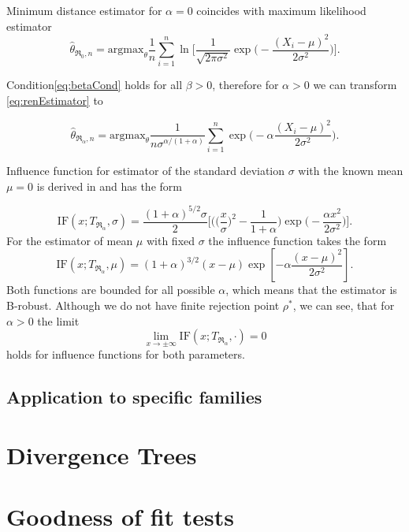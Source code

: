 Minimum \ren distance estimator for $\alpha = 0$ coincides with maximum likelihood estimator
\begin{equation}
\hat{\theta}_{\mathfrak{R}_0,n} = \text{argmax}_{\theta} \frac{1}{n}\sum_{i=1}^n \ln \biggl[\frac{1}{\sqrt{2\pi \sigma^2}} \exp\biggl(-\frac{(X_i-\mu)^2}{2\sigma^2}\biggr)\biggr].
\end{equation}

Condition\eqref{eq:betaCond} holds for all $\beta > 0$, therefore for $\alpha>0$ we can transform {\mRao} \eqref{eq:renEstimator} to

\begin{equation}
	\hat{\theta}_{\mathfrak{R}_\alpha,n} = \text{argmax}_{\theta} \frac{1}{n\sigma^{\alpha/(1+\alpha)}}\sum_{i=1}^n\exp \biggl(-\alpha\frac{(X_i-\mu)^2}{2\sigma^2}\biggr).
\end{equation}

\noindent Influence function for estimator of the standard deviation $\sigma$ with the known mean $\mu = 0$ is derived in \cite{Vajda2009} and has the form

\begin{equation}
	\text{IF}(x;T_{\mathfrak{R}_{\alpha}},\sigma) = \frac{(1+\alpha)^{5/2}\sigma}{2}\biggl[\biggl(\biggl(\frac{x}{\sigma}\biggr)^2-\frac{1}{1+\alpha}\biggr) \exp\biggl(-\frac{\alpha x^2}{2\sigma^2}\biggr)\biggr].
\end{equation}
For the estimator of mean $\mu$ with fixed $\sigma$ the influence function takes the form
\begin{equation}
	\text{IF}(x;T_{\mathfrak{R}_{\alpha}},\mu) = (1+\alpha )^{3/2} (x-\mu ) \exp\left[{-\alpha\frac{(x-\mu )^2}{2 \sigma ^2}}\right].
\end{equation}
Both functions are bounded for all possible $\alpha$, which means that the estimator is B-robust. Although we do not have finite rejection point $\rho^*$, we can see, that for $\alpha>0$ the limit 
\begin{equation}
	\lim_{x \rightarrow \pm\infty} \mathrm{IF}(x;T_{\mathfrak{R}_\alpha},\cdot) = 0
\end{equation}	
holds for influence functions for both parameters.	
	
	\section{Application to specific families}
		
	
\chapter{Divergence Trees}

\chapter{Goodness of fit tests}